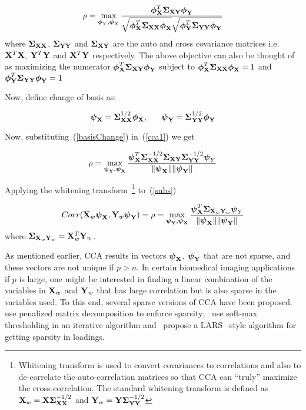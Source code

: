 \documentclass{llncs}
\newcommand{\X}{{\bf X}}
\newcommand{\Y}{{\bf Y}}
\newcommand{\bs}{\boldsymbol}
\begin{document}
\begin{equation}
\label{cca1}
\rho=\max_{{\bs\phi_Y}, {\bs\phi_X}}
\frac{{\bs\phi_{\X}^T\bs\Sigma_{\X\Y}}\bs\phi_{\Y}}{\sqrt{\bs\phi_{\X}^T\bs\Sigma_{\X\X}\bs\phi_{\X}}\sqrt{\bs\phi_{\Y}^T\bs\Sigma_{\Y\Y}\bs\phi_{\Y}}}
\end{equation}
where ${\bs\Sigma_{\X\X}}$, ${\bs\Sigma_{\Y\Y}}$ and ${\bs\Sigma_{\X\Y}}$ are the auto and cross covariance matrices i.e. $\X^T\X$, $\Y^T\Y$ and $\X^T\Y$ respectively. The above objective can also be thought of as maximizing the numerator $\bs\phi_{\X}^T\bs\Sigma_{\X\Y}\bs\phi_{\Y}$ subject to $\bs\phi_{\X}^T\bs\Sigma_{\X\X}\bs\phi_{\X} =1$ and $\bs\phi_{\Y}^T\bs\Sigma_{\Y\Y}\bs\phi_{\Y}=1$

Now, define change of basis as:

\begin{equation}
\label{basisChange}
\bs\psi_{\X} = \bs\Sigma_{\X\X}^{1/2}\bs\phi_{\X}, \;\;\;\;\;\;   \bs\psi_{\Y} = \bs\Sigma_{\Y\Y}^{1/2}\bs\phi_{\Y} 
\end{equation}

Now, substituting~(\ref{basisChange}) in~(\ref{cca1}) we get 

\begin{equation}
\label{subs}
\rho= \max_{{\bs\psi_{\Y}}, {\bs\psi_{\X}}} \frac{\bs\psi_{\X}^T \bs\Sigma_{\X\X}^{-1/2}\bs\Sigma_{\X\Y}\bs\Sigma_{\Y\Y}^{-1/2}\bs\psi_Y}{\|\bs\psi_{\X}\| \|\bs\psi_{\Y}\|}
\end{equation}

Applying the whitening transform~\footnote{Whitening transform is used to convert covariances to correlations and also to de-correlate the auto-correlation matrices so that CCA can ``truly'' maximize the cross-correlation. The standard whitening transform is defined as $\X_w= \X\bs\Sigma_{\X\X}^{-1/2}$ and $\Y_w= \Y\bs\Sigma_{\Y\Y}^{-1/2}$} to~(\ref{subs})

\begin{equation}
\label{simplifiedcca}
Corr(\X_w\bs\psi_{\X},\Y_w\bs\psi_{\Y})=\rho=\max_{{\bs\psi_{\Y}}, {\bs\psi_{\X}}} \frac{\bs\psi_{\X}^T \bs\Sigma_{\X_w\Y_w}\bs\psi_Y}{\|\bs\psi_{\X}\| \|\bs\psi_{\Y}\|}
\end{equation}
where $\bs\Sigma_{\X_w\Y_w} = \X_w^T\Y_w$. 

As mentioned earlier, CCA results in vectors $\bs\psi_{\X}$, $\bs\psi_{\Y}$ that are not sparse, and these vectors are not unique if $p > n$. In certain biomedical imaging applications if $p$ is large, one might be interested in finding a linear combination of the variables in $\X_w$ and $\Y_w$ that has large correlation but is also sparse in the variables used. To this end, several sparse versions of CCA have been proposed. ~\cite{witten} use penalized matrix decomposition to enforce sparsity;~\cite{parkhomenko} use soft-max thresholding in an iterative algorithm and~\cite{lykou} propose a LARS~\cite{lars} style algorithm for getting sparsity in loadings.
\end{document}

